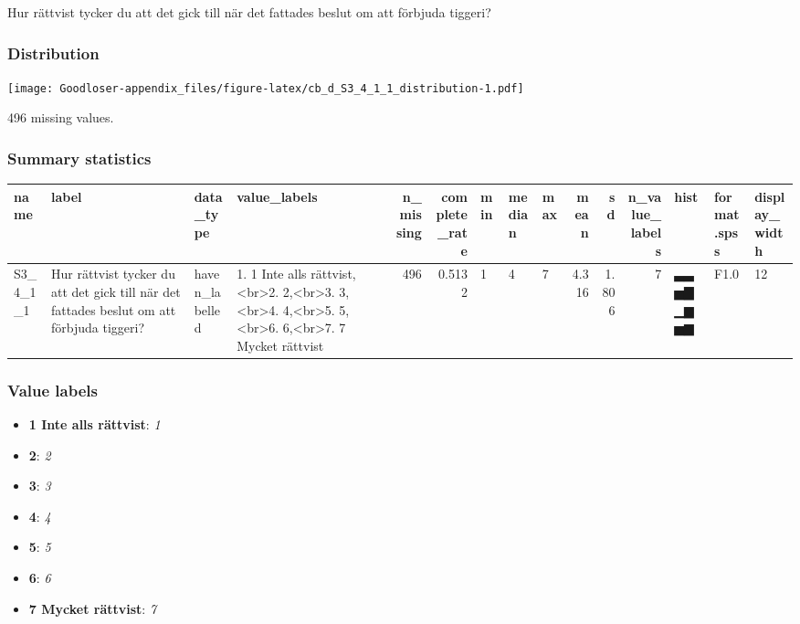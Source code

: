 \documentclass[
]{book}
\providecommand{\tightlist}{%
  \setlength{\itemsep}{0pt}\setlength{\parskip}{0pt}}
\begin{document}
Hur rättvist tycker du att det gick till när det fattades beslut om att förbjuda tiggeri?

\hypertarget{S3_4_1_1_distribution}{%
\subsubsection{Distribution}\label{S3_4_1_1_distribution}}

\texttt{[image: Goodloser-appendix\_files/figure-latex/cb\_d\_S3\_4\_1\_1\_distribution-1.pdf]}

496 missing values.

\hypertarget{S3_4_1_1_summary}{%
\subsubsection{Summary statistics}\label{S3_4_1_1_summary}}

\begin{tabular}{l|l|l|l|r|r|l|l|l|r|r|r|l|l|l}
\hline
name & label & data_type & value_labels & n_missing & complete_rate & min & median & max & mean & sd & n_value_labels & hist & format.spss & display_width\\
\hline
S3_4_1_1 & Hur rättvist tycker du att det gick till när det fattades beslut om att förbjuda tiggeri? & haven_labelled & 1. 1 Inte alls rättvist,<br>2. 2,<br>3. 3,<br>4. 4,<br>5. 5,<br>6. 6,<br>7. 7 Mycket rättvist & 496 & 0.5132 & 1 & 4 & 7 & 4.316 & 1.806 & 7 & ▃▃▅▇▁▆▅▆ & F1.0 & 12\\
\hline
\end{tabular}

\hypertarget{S3_4_1_1_labels}{%
\subsubsection{Value labels}\label{S3_4_1_1_labels}}

\begin{itemize}
\tightlist
\item
  \textbf{1 Inte alls rättvist}: \emph{1}
\item
  \textbf{2}: \emph{2}
\item
  \textbf{3}: \emph{3}
\item
  \textbf{4}: \emph{4}
\item
  \textbf{5}: \emph{5}
\item
  \textbf{6}: \emph{6}
\item
  \textbf{7 Mycket rättvist}: \emph{7}
\end{itemize}
\end{document}
